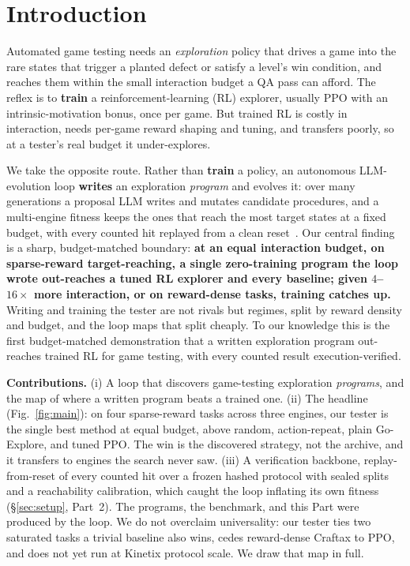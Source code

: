 
\section{Introduction}
\label{sec:intro}
Automated game testing needs an \emph{exploration} policy that drives a game into the rare states that trigger a planted
defect or satisfy a level's win condition, and reaches them within the small interaction budget a QA pass can afford. The
reflex is to \textbf{train} a reinforcement-learning (RL) explorer, usually PPO with an intrinsic-motivation bonus, once
per game. But trained RL is costly in interaction, needs per-game reward shaping and tuning, and transfers poorly, so at a
tester's real budget it under-explores.

We take the opposite route. Rather than \textbf{train} a policy, an autonomous LLM-evolution loop \textbf{writes} an
exploration \emph{program} and evolves it: over many generations a proposal LLM writes and mutates candidate procedures,
and a multi-engine fitness keeps the ones that reach the most target states at a fixed budget, with every counted hit
replayed from a clean reset~\citep{funsearch}. Our central finding is a sharp, budget-matched boundary:
\textbf{at an equal interaction budget, on sparse-reward target-reaching, a single zero-training program the loop wrote
out-reaches a tuned RL explorer and every baseline; given $4$--$16\times$ more interaction, or on reward-dense tasks,
training catches up.} Writing and training the tester are not rivals but regimes, split by reward density and budget, and
the loop maps that split cheaply. To our knowledge this is the first budget-matched demonstration that a written
exploration program out-reaches trained RL for game testing, with every counted result execution-verified.

\textbf{Contributions.} (i) A loop that discovers game-testing exploration \emph{programs}, and the map of where a written
program beats a trained one. (ii) The headline (Fig.~\ref{fig:main}): on four sparse-reward tasks across three engines, our
tester is the single best method at equal budget, above random, action-repeat, plain Go-Explore, and tuned PPO. The win is
the discovered strategy, not the archive, and it transfers to engines the search never saw. (iii) A verification backbone,
replay-from-reset of every counted hit over a frozen hashed protocol with sealed splits and a reachability calibration,
which caught the loop inflating its own fitness (\S\ref{sec:setup}, Part~2). The programs, the benchmark, and this Part
were produced by the loop. We do not overclaim universality: our tester ties two saturated tasks a trivial baseline also
wins, cedes reward-dense Craftax to PPO, and does not yet run at Kinetix protocol scale. We draw that map in full.

